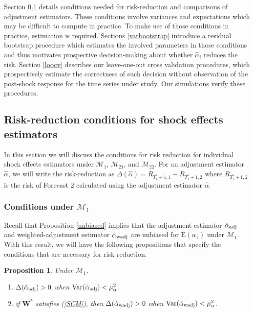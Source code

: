 \documentclass[11pt,3p,review,authoryear]{elsarticle}
\def\mbf#1{\mathbf{#1}} %
\def\mc#1{\mathcal{#1}} %
\def\E#1{\mathrm{E}(#1)} %
\def\var#1{\mathrm{Var}(#1)} %
\DeclareMathOperator{\Var}{Var} %
\newtheorem{prop}{Proposition}
\theoremstyle{definition}
\begin{document}
Section \ref{conditions} details conditions needed for risk-reduction and comparisons of adjustment estimators. These conditions involve variances and expectations which may be difficult to compute in practice. To make use of those conditions in practice, estimation is required. Sections \ref{varbootstrap} introduce a residual bootstrap procedure which estimates the involved parameters in those conditions and thus motivates prospective decision-making about whether $\hat{\alpha}_i$ reduces the risk. Section \ref{loocv} describes our leave-one-out cross validation procedures, which prospectively estimate the correctness of such decision without observation of the post-shock response for the time series under study. Our simulations verify these procedures. 


\subsection{Risk-reduction conditions for shock effects estimators}
\label{conditions}

In this section we will discuss the conditions for risk reduction for individual shock effects estimators under $\mc{M}_1$, $\mc{M}_{21}$, and $\mc{M}_{22}$.
For an adjustment estimator $\hat{\alpha}$, we will write the risk-reduction as $\Delta(\hat{\alpha})=R_{T_1^*+1,1}-R_{T_1^*+1,2}$ where $R_{T_1^*+1,2}$ is the risk of Forecast 2 calculated using the adjustment estimator $\hat{\alpha}$. 

\subsubsection{Conditions under $\mc{M}_1$}
 \label{conditionsmodel1}
 
Recall that Proposition \ref{unbiased} implies that the adjustment estimator $\hat{\alpha}_{\rm adj}$ and weighted-adjustment estimator $\hat{\alpha}_{\rm wadj}$ are unbiased for $\E{\alpha_1}$ under $\mc{M}_1$. With this result, we will have  the following propositions that specify the conditions that are necessary for risk reduction. 

\begin{prop}
\label{proprisk}Under $\mc{M}_1$,
\begin{enumerate}[label = (\roman*)]
  \item $\Delta(\hat\alpha_{\rm adj}) > 0$  when 
$\Var(\hat{\alpha}_{\rm adj}) < \mu_{\alpha}^2$.
  \item if $\mbf{W}^*$ satisfies (\ref{SCM}), then $\Delta(\hat\alpha_{\rm wadj}) > 0$ when $\var{\hat{\alpha}_{\rm wadj}}<\mu_{\alpha}^2$. 
\end{enumerate}
\end{prop}
\end{document}
